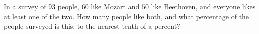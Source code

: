 In a survey of $93$ people, $60$ like Mozart and $50$ like Beethoven, and everyone likes at least one of the two. How many people like both, and what percentage of the people surveyed is this, to the nearest tenth of a percent?
